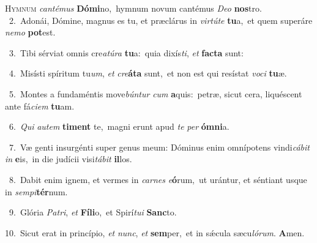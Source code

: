 \lettrine{\initial\textcolor{\initialcolor}{H}}{ymnum} \textit{can}\-\textit{té}\textit{mus} \textbf{Dó}\-\textbf{mi}no,~\star hymnum novum cantémus \textit{De}\-\textit{o} \textbf{nos}\-tro.\\
{\numbfont\textcolor{\numbcolor}{~2.}}~Adonái, Dómine, magnus es tu, et præclárus in \textit{vir}\-\textit{tú}\textit{te} \textbf{tu}\-a,~\star et quem superáre \textit{ne}\-\textit{mo} \textbf{pot}\-est.\par
{\numbfont\textcolor{\numbcolor}{~3.}}~Tibi sérviat omnis cre\-\textit{a}\-\textit{tú}\textit{ra} \textbf{tu}\-a:~\star quia dixís\-\textit{ti}\-, \textit{et} \textbf{fac}\-\textbf{ta} sunt:\par
{\numbfont\textcolor{\numbcolor}{~4.}}~Misísti spíritum tu\-\textit{um}\-, \textit{et} \textit{cre}\-\textbf{á}\textbf{ta} sunt,~\star et non est qui resístat \textit{vo}\-\textit{ci} \textbf{tu}\-æ.\par
{\numbfont\textcolor{\numbcolor}{~5.}}~Montes a fundaméntis move\-\textit{bún}\-\textit{tur} \textit{cum} \textbf{a}\-quis:~\star petræ, sicut cera, liquéscent ante fá\-\textit{ci}\-\textit{em} \textbf{tu}\-am.\par
{\numbfont\textcolor{\numbcolor}{~6.}}~\textit{Qui} \textit{au}\-\textit{tem} \textbf{ti}\-\textbf{ment} te,~\star magni erunt apud \textit{te} \textit{per} \textbf{óm}\-\textbf{ni}a.\par
{\numbfont\textcolor{\numbcolor}{~7.}}~Væ genti insurgénti super genus meum: Dóminus enim omnípotens vindi\-\textit{cá}\-\textit{bit} \textit{in} \textbf{e}\-is,~\star in die judícii visi\-\textit{tá}\-\textit{bit} \textbf{il}\-los.\par
{\numbfont\textcolor{\numbcolor}{~8.}}~Dabit enim ignem, et vermes in \textit{car}\-\textit{nes} \textit{e}\-\textbf{ó}rum,~\star ut urántur, et séntiant usque in \textit{sem}\-\textit{pi}\textbf{tér}num.\par
{\numbfont\textcolor{\numbcolor}{~9.}}~Glória \textit{Pa}\-\textit{tri}, \textit{et} \textbf{Fí}\-\textbf{li}o,~\star et Spirí\-\textit{tu}\-\textit{i} \textbf{Sanc}\-to.\par
{\numbfont\textcolor{\numbcolor}{10.}}~Sicut erat in princípio, \textit{et} \textit{nunc}\-, \textit{et} \textbf{sem}\-per,~\star et in sǽcula sæcu\-\textit{ló}\-\textit{rum}. \textbf{A}\-men.\par
